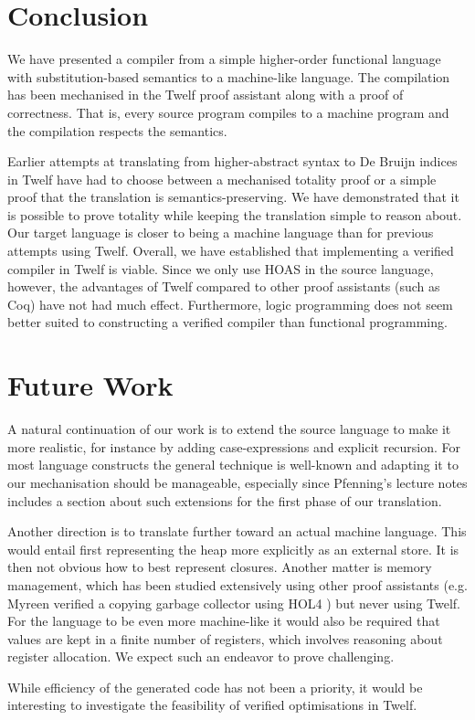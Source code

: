 \section{Conclusion}

We have presented a compiler from a simple higher-order functional language with substitution-based semantics to a machine-like language.
The compilation has been mechanised in the Twelf proof assistant along with a proof of correctness.
That is, every source program compiles to a machine program and the compilation respects the semantics.

Earlier attempts at translating from higher-abstract syntax to De Bruijn indices in Twelf have had to choose between a mechanised totality proof or a simple proof that the translation is semantics-preserving.
We have demonstrated that it is possible to prove totality while keeping the translation simple to reason about.
Our target language is closer to being a machine language than for previous attempts using Twelf.
Overall, we have established that implementing a verified compiler in Twelf is viable.
Since we only use HOAS in the source language, however, the advantages of Twelf compared to other proof assistants (such as Coq) have not had much effect.
Furthermore, logic programming does not seem better suited to constructing a verified compiler than functional programming.


\section{Future Work}

A natural continuation of our work is to extend the source language to make it more realistic, for instance by adding case-expressions and explicit recursion.
For most language constructs the general technique is well-known and adapting it to our mechanisation should be manageable, especially since Pfenning's lecture notes \cite{Pfenning01} includes a section about such extensions for the first phase of our translation.

Another direction is to translate further toward an actual machine language.
This would entail first representing the heap more explicitly as an external store.
It is then not obvious how to best represent closures. %
Another matter is memory management, which has been studied extensively using other proof assistants (e.g. Myreen verified a copying garbage collector using HOL4 \cite{Myreen10}) but never using Twelf.
For the language to be even more machine-like it would also be required that values are kept in a finite number of registers, which involves reasoning about register allocation.
We expect such an endeavor to prove challenging.

While efficiency of the generated code has not been a priority, it would be interesting to investigate the feasibility of verified optimisations in Twelf.
